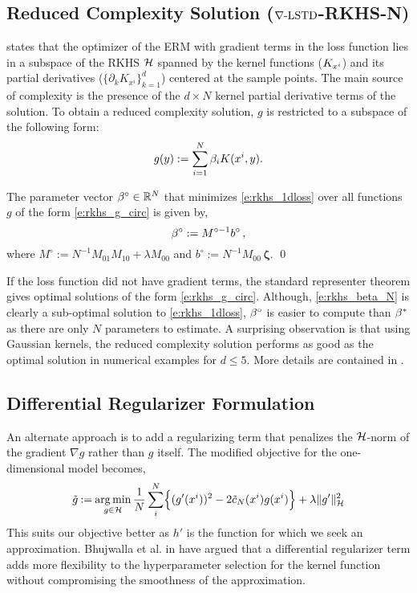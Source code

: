 \subsection{Reduced Complexity Solution ($\nabla\text{-LSTD}$-RKHS-N)}
\label{s:simple_rkhs}
 states that the optimizer of the ERM with gradient terms in the loss function lies in a subspace of the RKHS ${\cal H}$ spanned by the kernel functions ($K_{x^i}$) and its partial derivatives ($\{\partial_k K_{x^i}\}_{k=1}^d$) centered at the sample points. The main source of complexity is the presence of the $d \times N$ kernel partial derivative terms of the solution. To obtain a reduced complexity solution, $g$ is restricted to a subspace of the following form:
\begin{equation}
g(y)  := \sum_{i=1}^N \rkhsparam_i K(x^i,y).
\label{e:rkhs_g_circ}
\end{equation}
\begin{proposition}
	\label{t:bcirc}
	The parameter vector $\beta^\circ \in \mathbb{R}^N$ that minimizes \eqref{e:rkhs_1dloss}  over all functions $g$ of the form \eqref{e:rkhs_g_circ} is given by,
	\begin{equation}
	\rkhsparam^\circ  := M^{\circ -1} b^\circ   \,,
	\label{e:rkhs_beta_N}
	\end{equation}
	where $ M^\circ := N^{-1} M_{01} M_{10} + \lambda M_{00}$ and $ b^\circ := N^{-1} M_{00} \, \boldsymbol{\zeta} $.
	\qed
\end{proposition}
If the loss function did not have gradient terms, the standard representer theorem gives optimal solutions of the form \eqref{e:rkhs_g_circ}. Although, \eqref{e:rkhs_beta_N} is clearly a sub-optimal solution to \eqref{e:rkhs_1dloss}, $\beta^\circ$  is easier to compute than $\beta^*$ as there are only $N$ parameters to estimate. A surprising observation is that using Gaussian kernels, the reduced complexity solution performs as good as the optimal solution in numerical examples for $d \leq 5$. More details are contained in .

\subsection{Differential Regularizer Formulation}
\label{s:diffReg} 

An alternate approach is to add a regularizing term that penalizes the ${\cal H}$-norm of the gradient $\nabla g$ rather than $g$ itself. The modified objective for the one-dimensional model becomes,
\begin{equation}
\tilg \eqdef \argmin_{g\in\clH} \frac{1}{N} \sum_{i}^N \Bigl\{ (g'(x^i))^2 - 2 \tilc_N(x^i) g(x^i)  \Bigr\} + \lambda \|g'\|_\clH^2
\label{e:rkhs_1dloss_diff}
\end{equation}
This suits our objective better as $h'$ is the function for which we seek an approximation. Bhujwalla et al. in \cite{bhujlaugil} have argued that a differential regularizer term adds more flexibility to the hyperparameter selection for the kernel function without compromising the smoothness of the approximation.

